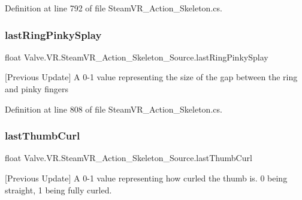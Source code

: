Definition at line 792 of file Steam\+V\+R\+\_\+\+Action\+\_\+\+Skeleton.\+cs.

\mbox{\label{class_valve_1_1_v_r_1_1_steam_v_r___action___skeleton___source_a762a1fc95f5d6fe0b6830e119b578b6a}} 
\subsubsection{\texorpdfstring{lastRingPinkySplay}{lastRingPinkySplay}}
{\footnotesize\ttfamily float Valve.\+V\+R.\+Steam\+V\+R\+\_\+\+Action\+\_\+\+Skeleton\+\_\+\+Source.\+last\+Ring\+Pinky\+Splay\hspace{0.3cm}{\ttfamily [get]}}



\mbox{[}Previous Update\mbox{]} A 0-\/1 value representing the size of the gap between the ring and pinky fingers 



Definition at line 808 of file Steam\+V\+R\+\_\+\+Action\+\_\+\+Skeleton.\+cs.

\mbox{\label{class_valve_1_1_v_r_1_1_steam_v_r___action___skeleton___source_a5df36c1b14347ffd7d64518678a6acbd}} 
\subsubsection{\texorpdfstring{lastThumbCurl}{lastThumbCurl}}
{\footnotesize\ttfamily float Valve.\+V\+R.\+Steam\+V\+R\+\_\+\+Action\+\_\+\+Skeleton\+\_\+\+Source.\+last\+Thumb\+Curl\hspace{0.3cm}{\ttfamily [get]}}



\mbox{[}Previous Update\mbox{]} A 0-\/1 value representing how curled the thumb is. 0 being straight, 1 being fully curled. 



